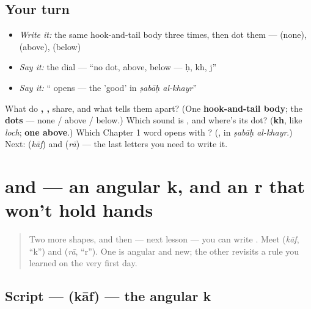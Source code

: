 \subsection*{Your turn}
\begin{itemize}
\raggedright
  \item \emph{Write it:} the same hook-and-tail body three times, then dot them —  (none),  (above),  (below)
  \item \emph{Say it:} the dial — \textquotedblleft{}no dot, above, below — ḥ, kh, j\textquotedblright{}
  \item \emph{Say it:} \textquotedblleft{} opens  — the 'good' in \emph{ṣabāḥ al-khayr}\textquotedblright{}
\end{itemize}

\begin{tcolorbox}[breakable,colback=teal!4,colframe=teal!35!black,title={Before you move on}]
What do \textbf{, , } share, and what tells them apart? (One \textbf{hook-and-tail body}; the \textbf{dots} — none / above / below.) Which sound is \emph{}, and where's its dot? (\textbf{kh}, like \emph{loch}; \textbf{one above}.) Which Chapter 1 word opens with \emph{}? (\textbf{}, in \emph{ṣabāḥ al-khayr}.) Next: \textbf{} (\emph{kāf}) and \textbf{} (\emph{rā}) — the last letters you need to write it.
\end{tcolorbox}
\section[\texorpdfstring{\ar{ك،} \ar{ر} (kāf, rā)}{ك، ر (kāf, rā)}]{ and  — an angular k, and an r that won't hold hands}

\label{lesson:AR-W08-kaf-and-ra}



\begin{quote}
Two more shapes, and then — next lesson — you can write \textbf{}. Meet \textbf{} (\emph{kāf}, \textquotedblleft{}k\textquotedblright{}) and \textbf{} (\emph{rā}, \textquotedblleft{}r\textquotedblright{}). One is angular and new; the other revisits a rule you learned on the very first day.
\end{quote}

\subsection*{Script —  (kāf) — the angular k}

